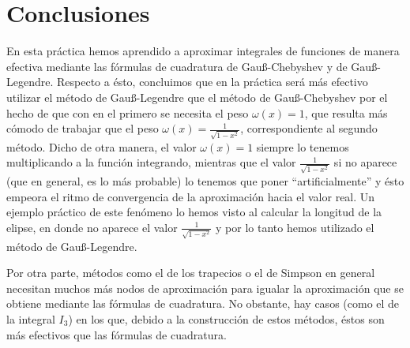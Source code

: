 \documentclass[a4paper]{article}
\begin{document}
\section*{Conclusiones} 
En esta práctica hemos aprendido a aproximar integrales de funciones de manera efectiva mediante las fórmulas de cuadratura de Gau\ss-Chebyshev y de Gau\ss-Legendre. Respecto a ésto, concluimos que en la práctica será más efectivo utilizar el método de Gau\ss-Legendre que el método de Gau\ss-Chebyshev por el hecho de que con en el primero se necesita el peso $\omega(x)=1$, que resulta más cómodo de trabajar que el peso $\omega(x)=\frac{1}{\sqrt{1-x^2}}$, correspondiente al segundo método. Dicho de otra manera, el valor $\omega(x)=1$ siempre lo tenemos multiplicando a la función integrando, mientras que el valor $\frac{1}{\sqrt{1-x^2}}$ si no aparece (que en general, es lo más probable) lo tenemos que poner ``artificialmente'' y ésto empeora el ritmo de convergencia de la aproximación hacia el valor real. Un ejemplo práctico de este fenómeno lo hemos visto al calcular la longitud de la elipse, en donde no aparece el valor $\frac{1}{\sqrt{1-x^2}}$ y por lo tanto hemos utilizado el método de Gau\ss-Legendre.\par 
Por otra parte, métodos como el de los trapecios o el de Simpson en general necesitan muchos más nodos de aproximación para igualar la aproximación que se obtiene mediante las fórmulas de cuadratura. No obstante, hay casos (como el de la integral $I_3$) en los que, debido a la construcción de estos métodos, éstos son más efectivos que las fórmulas de cuadratura. 
\end{document}
